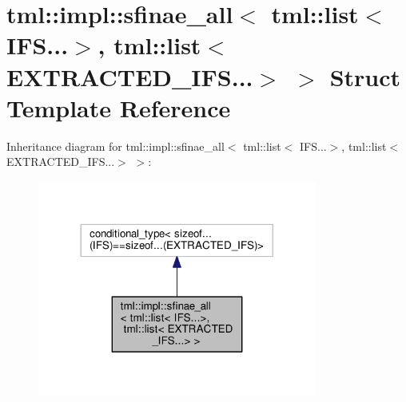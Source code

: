 \hypertarget{structtml_1_1impl_1_1sfinae__all_3_01tml_1_1list_3_01_i_f_s_8_8_8_4_00_01tml_1_1list_3_01_e_x_t_d8eb602d54b7c12f0448b26277f194d7}{\section{tml\+:\+:impl\+:\+:sfinae\+\_\+all$<$ tml\+:\+:list$<$ I\+F\+S...$>$, tml\+:\+:list$<$ E\+X\+T\+R\+A\+C\+T\+E\+D\+\_\+\+I\+F\+S...$>$ $>$ Struct Template Reference}
\label{structtml_1_1impl_1_1sfinae__all_3_01tml_1_1list_3_01_i_f_s_8_8_8_4_00_01tml_1_1list_3_01_e_x_t_d8eb602d54b7c12f0448b26277f194d7}
}


Inheritance diagram for tml\+:\+:impl\+:\+:sfinae\+\_\+all$<$ tml\+:\+:list$<$ I\+F\+S...$>$, tml\+:\+:list$<$ E\+X\+T\+R\+A\+C\+T\+E\+D\+\_\+\+I\+F\+S...$>$ $>$\+:
\nopagebreak
\begin{figure}[H]
\begin{center}
\leavevmode
\includegraphics[width=260pt]{structtml_1_1impl_1_1sfinae__all_3_01tml_1_1list_3_01_i_f_s_8_8_8_4_00_01tml_1_1list_3_01_e_x_t_531a418e87f4cca661b8c66ccde43dc8}
\end{center}
\end{figure}


